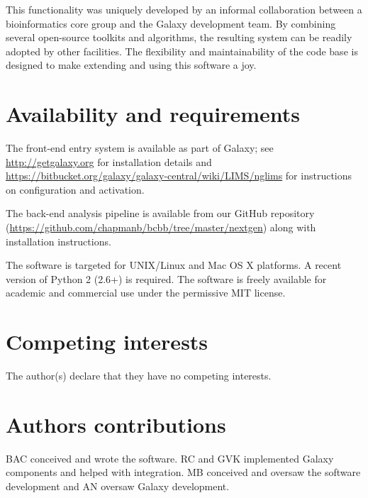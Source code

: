 \documentclass[10pt]{bmc_article}
\newenvironment{bmcformat}{\begin{raggedright}\baselineskip20pt\sloppy\setboolean{publ}{false}}{\end{raggedright}\baselineskip20pt\sloppy}
\begin{document}
\begin{bmcformat}
This functionality was uniquely developed by an informal collaboration
between a bioinformatics core group and the Galaxy development
team. By combining several open-source toolkits and algorithms, the
resulting system can be readily adopted by other facilities. The
flexibility and maintainability of the code base is designed to make
extending and using this software a joy.

\section*{Availability and requirements}

The front-end entry system is available as part of Galaxy; see
\url{http://getgalaxy.org} for installation details and
\url{https://bitbucket.org/galaxy/galaxy-central/wiki/LIMS/nglims} for
instructions on configuration and activation.

The back-end analysis pipeline is available from our GitHub repository
(\url{https://github.com/chapmanb/bcbb/tree/master/nextgen}) along
with installation instructions.

The software is targeted for UNIX/Linux and Mac OS X platforms. A
recent version of Python 2 (2.6+) is required. The software is
freely available for academic and commercial use under the
permissive MIT license.

\section*{Competing interests}

The author(s) declare that they have no competing interests.

\section*{Authors contributions}

BAC conceived and wrote the software. RC and GVK implemented
Galaxy components and helped with integration. MB conceived and oversaw the software
development and AN oversaw Galaxy development.


{
   }  %



\end{bmcformat}
\end{document}
